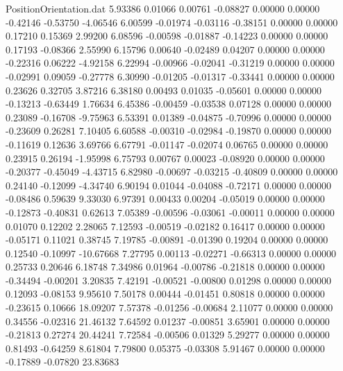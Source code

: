 \begin{filecontents}{PositionOrientation.dat}
   5.93386    0.01066    0.00761    -0.08827    0.00000    0.00000   -0.42146   -0.53750   -4.06546
   6.00599   -0.01974   -0.03116    -0.38151    0.00000    0.00000    0.17210    0.15369    2.99200
   6.08596   -0.00598   -0.01887    -0.14223    0.00000    0.00000    0.17193   -0.08366    2.55990
   6.15796    0.00640   -0.02489     0.04207    0.00000    0.00000   -0.22316    0.06222   -4.92158
   6.22994   -0.00966   -0.02041    -0.31219    0.00000    0.00000   -0.02991    0.09059   -0.27778
   6.30990   -0.01205   -0.01317    -0.33441    0.00000    0.00000    0.23626    0.32705    3.87216
   6.38180    0.00493    0.01035    -0.05601    0.00000    0.00000   -0.13213   -0.63449    1.76634
   6.45386   -0.00459   -0.03538     0.07128    0.00000    0.00000    0.23089   -0.16708   -9.75963
   6.53391    0.01389   -0.04875    -0.70996    0.00000    0.00000   -0.23609    0.26281    7.10405
   6.60588   -0.00310   -0.02984    -0.19870    0.00000    0.00000   -0.11619    0.12636    3.69766
   6.67791   -0.01147   -0.02074     0.06765    0.00000    0.00000    0.23915    0.26194   -1.95998
   6.75793    0.00767    0.00023    -0.08920    0.00000    0.00000   -0.20377   -0.45049   -4.43715
   6.82980   -0.00697   -0.03215    -0.40809    0.00000    0.00000    0.24140   -0.12099   -4.34740
   6.90194    0.01044   -0.04088    -0.72171    0.00000    0.00000   -0.08486    0.59639    9.33030
   6.97391    0.00433    0.00204    -0.05019    0.00000    0.00000   -0.12873   -0.40831    0.62613
   7.05389   -0.00596   -0.03061    -0.00011    0.00000    0.00000    0.01070    0.12202    2.28065
   7.12593   -0.00519   -0.02182     0.16417    0.00000    0.00000   -0.05171    0.11021    0.38745
   7.19785   -0.00891   -0.01390     0.19204    0.00000    0.00000    0.12540   -0.10997  -10.67668
   7.27795    0.00113   -0.02271    -0.66313    0.00000    0.00000    0.25733    0.20646    6.18748
   7.34986    0.01964   -0.00786    -0.21818    0.00000    0.00000   -0.34494   -0.00201    3.20835
   7.42191   -0.00521   -0.00800     0.01298    0.00000    0.00000    0.12093   -0.08153    9.95610
   7.50178    0.00444   -0.01451     0.80818    0.00000    0.00000   -0.23615    0.10666   18.09207
   7.57378   -0.01256   -0.00684     2.11077    0.00000    0.00000    0.34556   -0.02316   21.46132
   7.64592    0.01237   -0.00851     3.65901    0.00000    0.00000   -0.21813    0.27274   20.44241
   7.72584   -0.00506    0.01329     5.29277    0.00000    0.00000    0.81493   -0.64259    8.61804
   7.79800    0.05375   -0.03308     5.91467    0.00000    0.00000   -0.17889   -0.07820   23.83683

\end{filecontents}
